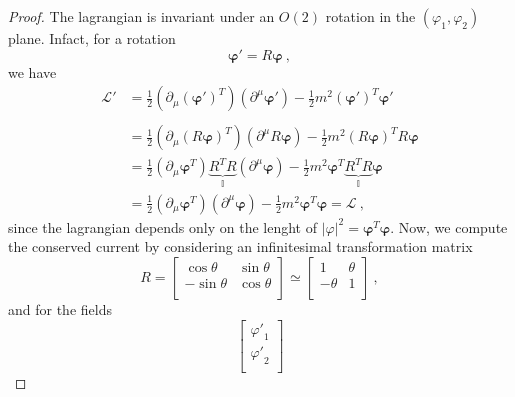     \begin{proof}
        The lagrangian is invariant under an $O(2)$ rotation in the $(\varphi_1, \varphi_2)$ plane. Infact, for a rotation 
        \begin{equation*}
            \boldsymbol \varphi' = R \boldsymbol \varphi ~,
        \end{equation*}
        we have 
        \begin{equation*}
        \begin{aligned}
            \mathcal L' & = \frac{1}{2} (\partial_\mu (\boldsymbol \varphi')^T) (\partial^\mu \boldsymbol \varphi') - \frac{1}{2} m^2 (\boldsymbol \varphi')^T \boldsymbol \varphi' \\ & \\ & = \frac{1}{2} (\partial_\mu (R \boldsymbol \varphi)^T) (\partial^\mu R \boldsymbol \varphi) - \frac{1}{2} m^2 (R \boldsymbol \varphi)^T R \boldsymbol \varphi \\ & = \frac{1}{2} (\partial_\mu \boldsymbol \varphi^T) \underbrace{R^T R}_{\mathbb I} (\partial^\mu \boldsymbol \varphi) - \frac{1}{2} m^2 \boldsymbol \varphi^T \underbrace{R^T R}_{\mathbb I} \boldsymbol \varphi \\ & = \frac{1}{2} (\partial_\mu \boldsymbol \varphi^T) (\partial^\mu \boldsymbol \varphi) - \frac{1}{2} m^2 \boldsymbol \varphi^T \boldsymbol \varphi = \mathcal L ~,
        \end{aligned}
        \end{equation*}
        since the lagrangian depends only on the lenght of $|\varphi|^2 = \boldsymbol \varphi^T \boldsymbol \varphi$. Now, we compute the conserved current by considering an infinitesimal transformation matrix 
        \begin{equation*}
            R = \begin{bmatrix}
                \cos \theta & \sin \theta \\ - \sin \theta & \cos \theta \\
            \end{bmatrix} \simeq \begin{bmatrix}
                1 & \theta \\ - \theta & 1 \\
            \end{bmatrix} ~,
        \end{equation*}
        and for the fields 
        \begin{equation*}
            \begin{bmatrix}
                {\varphi'}_1 \\ {\varphi'}_2\\

\end{bmatrix}
\end{equation*}
\end{proof}
